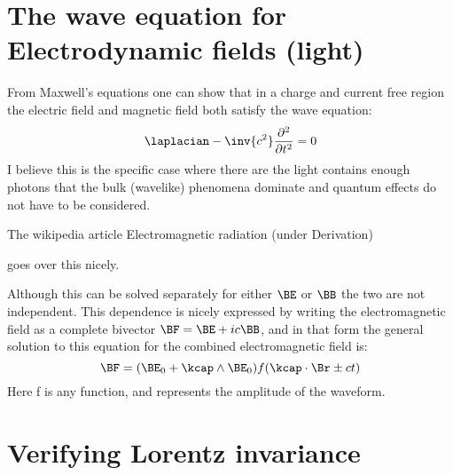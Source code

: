 \section{The wave equation for Electrodynamic fields (light)}

From Maxwell's equations one can show that in a charge and current free region
the electric field and magnetic field both satisfy the wave equation:
%
\begin{equation}
\laplacian - \inv{c^2}\frac{\partial^2}{\partial t^2} = 0
\end{equation}
%
I believe this is the specific case where there are the light contains enough
photons that the bulk (wavelike) phenomena dominate and quantum effects do not have to be considered.

The wikipedia article Electromagnetic radiation (under Derivation)


goes over this nicely.

Although this can be solved separately for either \(\BE\) or \(\BB\) the two are not independent.
This dependence is nicely expressed by writing the electromagnetic field as a complete
bivector \(\BF = \BE + i c \BB\), and in that form the
general solution to this equation for the combined electromagnetic
field is:
%
\begin{equation}
\BF = (\BE_0 + \kcap \wedge \BE_0) f( \kcap \cdot \Br \pm c t)
\end{equation}
%
Here f is any function, and represents the amplitude of the waveform.

\section{Verifying Lorentz invariance}

